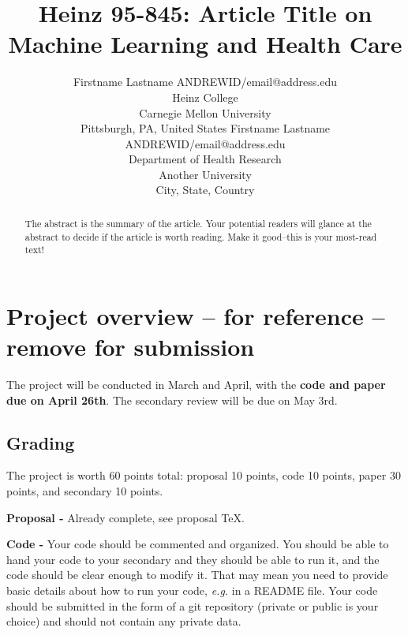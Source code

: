 \documentclass[twoside,11pt]{article}
\begin{document}
\title{Heinz 95-845: Article Title on \\Machine Learning and Health Care}

\author{\name Firstname Lastname \email ANDREWID/email@address.edu \\
       \addr Heinz College\\
       Carnegie Mellon University\\
       Pittsburgh, PA, United States
       \AND
       \name Firstname Lastname \email ANDREWID/email@address.edu \\
       \addr Department of Health Research\\
       Another University \\
       City, State, Country} 

\maketitle

\begin{abstract}
  The abstract is the summary of the article. Your potential readers will glance at the abstract to decide
  if the article is worth reading. Make it good--this is your most-read text!  
\end{abstract}

\section{Project overview -- for reference -- remove for submission}

The project will be conducted in March and April, with the \textbf{code and paper due on April 26th}. The secondary review will be due on May 3rd.

\subsection{Grading}
The project is worth 60 points total: proposal 10 points, code 10 points, paper 30 points, and secondary 10 points.

\textbf{Proposal -} Already complete, see proposal TeX.

\textbf{Code -} Your code should be commented and organized. You should be able to hand your code to your secondary and they should be able to run it, and the code should be clear enough to modify it. That may mean you need to provide basic details about how to run your code, \emph{e.g.} in a README file. Your code should be submitted in the form of a git repository (private or public is your choice) and should not contain any private data. 
\end{document}
